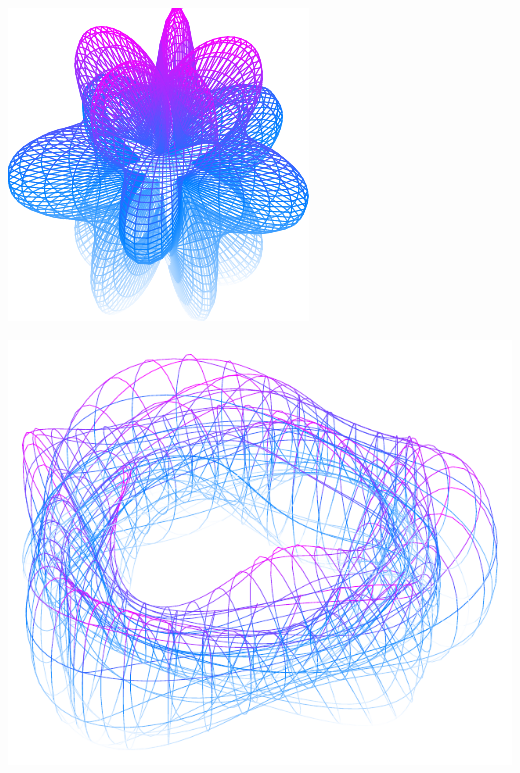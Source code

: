 \documentclass[11pt,openany]{article}
\begin{document}
\begin{center}
\begin{minipage}{.45\textwidth}\centering
	\includegraphics[scale=.9]{../tikz/grad-math-tikz-pdf/sphere3.pdf}
\end{minipage}
\begin{minipage}{.45\textwidth}\centering
	\includegraphics[scale=.5]{../tikz/grad-math-tikz-pdf/torus3.pdf}
\end{minipage}
\end{center}
\vfill
\end{document}
